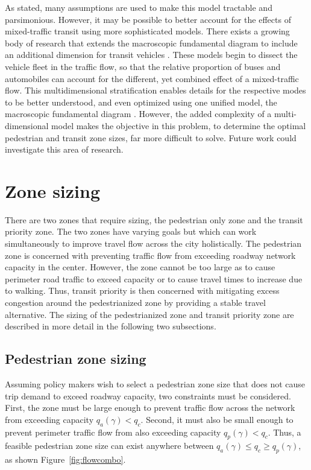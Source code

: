 \documentclass{elsarticle}\usepackage[]{graphicx}\usepackage[]{color}
\begin{document}
As stated, many assumptions are used to make this model tractable and parsimonious. However, it may be possible to better account for the effects of mixed-traffic transit using more sophisticated models. There exists a growing body of research that extends the macroscopic fundamental diagram to include an additional dimension for transit vehicles \citep{Zheng2013,Geroliminis2014,Loder2017}. These models begin to dissect the vehicle fleet in the traffic flow, so that the relative proportion of buses and automobiles can account for the different, yet combined effect of a mixed-traffic flow. This multidimensional stratification enables details for the respective modes to be better understood, and even optimized using one unified model, the macroscopic fundamental diagram \citep{Zheng2016,Zheng2016a}. However, the added complexity of a multi-dimensional model makes the objective in this problem, to determine the optimal pedestrian and transit zone sizes, far more difficult to solve. Future work could investigate this area of research.

\section{Zone sizing}
There are two zones that require sizing, the pedestrian only zone and the transit priority zone. The two zones have varying goals but which can work simultaneously to improve travel flow across the city holistically. The pedestrian zone is concerned with preventing traffic flow from exceeding roadway network capacity in the center. However, the zone cannot be too large as to cause perimeter road traffic to exceed capacity or to cause travel times to increase due to walking. Thus, transit priority is then concerned with mitigating excess congestion around the pedestrianized zone by providing a stable travel alternative. The sizing of the pedestrianized zone and transit priority zone are described in more detail in the following two subsections.

\subsection{Pedestrian zone sizing}
Assuming policy makers wish to select a pedestrian zone size that does not cause trip demand to exceed roadway capacity, two constraints must be considered. First, the zone must be large enough to prevent traffic flow across the network from exceeding capacity $q_a(\gamma) < q_c$. Second, it must also be small enough to prevent perimeter traffic flow from also exceeding capacity $q_p(\gamma) < q_c$. Thus, a feasible pedestrian zone size can exist anywhere between $q_a(\gamma) \leq q_c \geq q_p(\gamma)$, as shown Figure~\ref{fig:flowcombo}.
\end{document}
